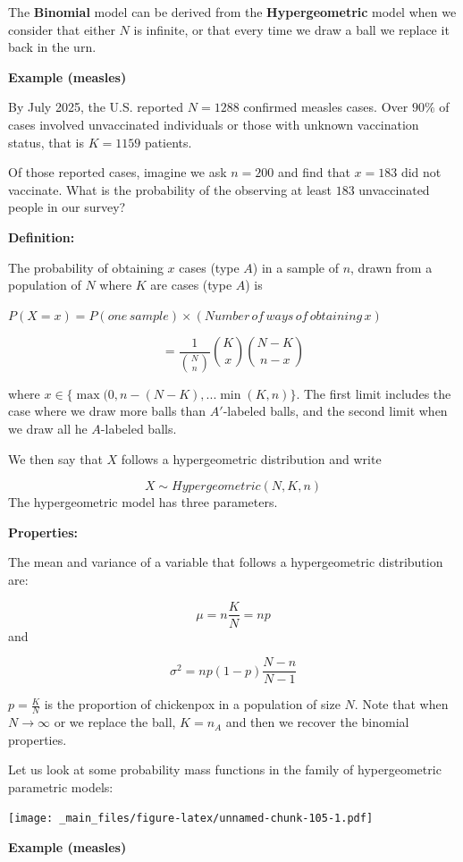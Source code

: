 \documentclass[
]{book}
\begin{document}
The \textbf{Binomial} model can be derived from the \textbf{Hypergeometric} model when we consider that either \(N\) is infinite, or that every time we draw a ball we replace it back in the urn.

\textbf{Example (measles)}

By July 2025, the U.S. reported \(N=1288\) confirmed measles cases. Over \(90\%\) of cases involved unvaccinated individuals or those with unknown vaccination status, that is \(K=1159\) patients.

Of those reported cases, imagine we ask \(n=200\) and find that \(x=183\) did not vaccinate. What is the probability of the observing at least \(183\) unvaccinated people in our survey?

\textbf{Definition:}

The probability of obtaining \(x\) cases (type \(A\)) in a sample of \(n\), drawn from a population of \(N\) where \(K\) are cases (type \(A\)) is

\(P(X=x)=P(one\,sample) \times (Number\, of\, ways\, of\, obtaining\, x)\)

\[=\frac{1}{\binom N n}\binom K x \binom {N-K} {n-x}\]

where \(x \in \{\max(0, n-(N-K), ... \min(K, n) \}\). The first limit includes the case where we draw more balls than \(A'\)-labeled balls, and the second limit when we draw all he \(A\)-labeled balls.

We then say that \(X\) follows a hypergeometric distribution and write

\[X \sim Hypergeometric(N,K,n)\]
The hypergeometric model has three parameters.

\textbf{Properties:}

The mean and variance of a variable that follows a hypergeometric distribution are:

\[\mu =  n  \frac{K}{N} = np\]
and

\[\sigma^2 = np(1-p)\frac{N-n}{N-1}\]

\(p=\frac{K}{N}\) is the proportion of chickenpox in a population of size \(N\). Note that when \(N \rightarrow \infty\) or we replace the ball, \(K=n_A\) and then we recover the binomial properties.

Let us look at some probability mass functions in the family of hypergeometric parametric models:

\texttt{[image: \_main\_files/figure-latex/unnamed-chunk-105-1.pdf]}

\textbf{Example (measles)}
\end{document}
